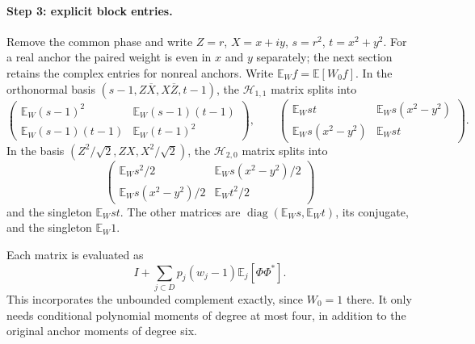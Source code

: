\paragraph{Step 3: explicit block entries.}
Remove the common phase and write $Z=r$, $X=x+iy$, $s=r^2$,
$t=x^2+y^2$. For a real anchor the paired weight is even in $x$ and $y$ separately; the next section retains the complex entries for nonreal anchors.
Write $\mathbb E_W f=\mathbb E[W_0f]$. In the orthonormal basis
$(s-1,Z\overline X,X\overline Z,t-1)$, the $\mathcal H_{1,1}$ matrix
splits into
\[
 \begin{pmatrix}
 \mathbb E_W(s-1)^2&\mathbb E_W(s-1)(t-1)\\
 \mathbb E_W(s-1)(t-1)&\mathbb E_W(t-1)^2
 \end{pmatrix},\qquad
 \begin{pmatrix}
 \mathbb E_Wst&\mathbb E_Ws(x^2-y^2)\\
 \mathbb E_Ws(x^2-y^2)&\mathbb E_Wst
 \end{pmatrix}.
\]
In the basis $(Z^2/\sqrt2,ZX,X^2/\sqrt2)$, the $\mathcal H_{2,0}$
matrix splits into
\[
 \begin{pmatrix}
 \mathbb E_Ws^2/2&\mathbb E_Ws(x^2-y^2)/2\\
 \mathbb E_Ws(x^2-y^2)/2&\mathbb E_Wt^2/2
 \end{pmatrix}
\]
and the singleton $\mathbb E_Wst$. The other matrices are
$\operatorname{diag}(\mathbb E_Ws,\mathbb E_Wt)$, its conjugate,
and the singleton $\mathbb E_W1$.

Each matrix is evaluated as
\[
 I+\sum_{j\subset D}p_j(w_j-1)\mathbb E_j[\Phi\Phi^*].
\]
This incorporates the unbounded complement exactly, since $W_0=1$
there. It only needs conditional polynomial moments of degree at most
four, in addition to the original anchor moments of degree six.

